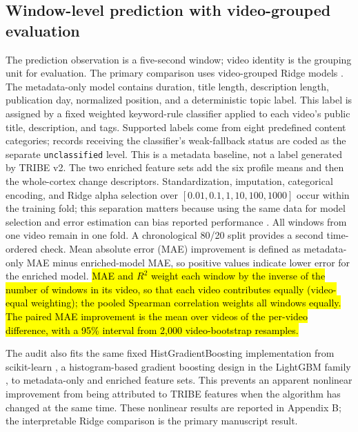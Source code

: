 \documentclass{ieeeaccess}
\newcommand{\rev}[1]{\hl{#1}}
\newcommand{\rev}[1]{#1}
\begin{document}
\subsection{Window-level prediction with video-grouped evaluation}
The prediction observation is a five-second window; video identity is the grouping unit for evaluation. The primary comparison uses video-grouped Ridge models \cite{hoerl1970ridge}. The metadata-only model contains duration, title length, description length, publication day, normalized position, and a deterministic topic label. This label is assigned by a fixed weighted keyword-rule classifier applied to each video's public title, description, and tags. Supported labels come from eight predefined content categories; records receiving the classifier's weak-fallback status are coded as the separate \texttt{unclassified} level. This is a metadata baseline, not a label generated by TRIBE v2. The two enriched feature sets add the six profile means and then the whole-cortex change descriptors. Standardization, imputation, categorical encoding, and Ridge alpha selection over $[0.01,0.1,1,10,100,1000]$ occur within the training fold; this separation matters because using the same data for model selection and error estimation can bias reported performance \cite{varma2006crossvalidation}. All windows from one video remain in one fold. A chronological 80/20 split provides a second time-ordered check. Mean absolute error (MAE) improvement is defined as metadata-only MAE minus enriched-model MAE, so positive values indicate lower error for the enriched model. \rev{MAE and $R^2$ weight each window by the inverse of the number of windows in its video, so that each video contributes equally (video-equal weighting); the pooled Spearman correlation weights all windows equally. The paired MAE improvement is the mean over videos of the per-video difference, with a 95\% interval from 2,000 video-bootstrap resamples.}

The audit also fits the same fixed HistGradientBoosting implementation from scikit-learn \cite{pedregosa2011scikit}, a histogram-based gradient boosting design in the LightGBM family \cite{ke2017lightgbm}, to metadata-only and enriched feature sets. This prevents an apparent nonlinear improvement from being attributed to TRIBE features when the algorithm has changed at the same time. These nonlinear results are reported in Appendix B; the interpretable Ridge comparison is the primary manuscript result.
\end{document}
